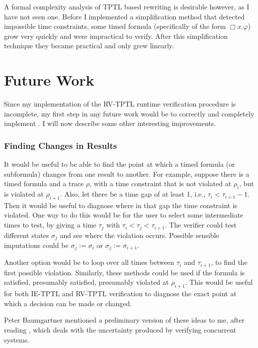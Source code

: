\documentclass[a4paper]{article}
\begin{document}
A formal complexity analysis of TPTL based rewriting is desirable however, as I have not seen one. Before I implemented a simplification method that detected impossible time constraints, some timed formula (specifically of the form $\Box x. \varphi$) grow very quickly and were impractical to verify. After this simplification technique they became practical and only grew linearly.

\section{Future Work}
Since my implementation of the RV-TPTL runtime verification procedure is incomplete, my first step in any future work would be to correctly and completely implement . I will now describe some other interesting improvements.

\subsubsection{Finding Changes in Results}
It would be useful to be able to find the point at which a timed formula (or subformula) changes from one result to another. For example, suppose there is a timed formula and a trace $\rho$, with a time constraint that is not violated at $\rho_i$, but is violated at $\rho_{i+1}$. Also, let there be a time gap of at least 1, i.e., $\tau_i < \tau_{i+1} - 1$. Then it would be useful to diagnose where in that gap the time constraint is violated. One way to do this would be for the user to select some intermediate times to test, by giving a time $\tau_j$ with $\tau_i < \tau_j < \tau_{i+1}$. The verifier could test different states $\sigma_j$ and see where the violation occurs. Possible sensible imputations could be $\sigma_j := \sigma_i$ or $\sigma_j := \sigma_{i+1}$.

Another option would be to loop over all times between $\tau_i$ and $\tau_{i+1}$, to find the first possible violation. Similarly, these methods could be used if the formula is satisfied, presumably satisfied, presumably violated at $\rho_{i+1}$. This would be useful for both IE-TPTL and RV-TPTL verification to diagnose the exact point at which a decision can be made or changed.

Peter Baumgartner mentioned a preliminary version of these ideas to me, after reading \textcite{chai2014fivevalued}, which deals with the uncertainty produced by verifying concurrent systems.
\end{document}
